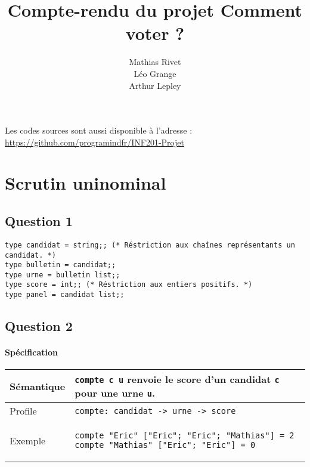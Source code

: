 \documentclass[french, 10pt, a4paper]{article}
\title{Compte-rendu du projet Comment voter ?}
\author{
	Mathias Rivet\\
	Léo Grange\\
	Arthur Lepley
}
\begin{document}
	\maketitle

	Les codes sources sont aussi disponible à l'adresse : \href{https://github.com/programindfr/INF201-Projet}{https://github.com/programindfr/INF201-Projet}

	\tableofcontents



\section{Scrutin uninominal}

\subsection{Question 1}

\begin{verbatim}
type candidat = string;; (* Réstriction aux chaînes représentants un candidat. *)
type bulletin = candidat;;
type urne = bulletin list;;
type score = int;; (* Réstriction aux entiers positifs. *)
type panel = candidat list;;
\end{verbatim}



\subsection{Question 2}

\paragraph{Spécification}

\begin{center}
	\begin{tabular}{|p{2cm}|p{\dimexpr\linewidth-2cm-4\tabcolsep-3\arrayrulewidth}|}
		\hline
		Sémantique
		&
		\texttt{compte c u} renvoie le score d'un candidat \texttt{c} pour une urne \texttt{u}. %
%
		\\
		\hline
		Profile
		&
		\texttt{compte: candidat -> urne -> score}
%
		\\
		\hline
		Exemple
		&
		\begin{verbatim}
compte "Eric" ["Eric"; "Eric"; "Mathias"] = 2
compte "Mathias" ["Eric"; "Eric"] = 0
		\end{verbatim}
%
		\\
		\hline
	\end{tabular}
\end{center}
\end{document}
